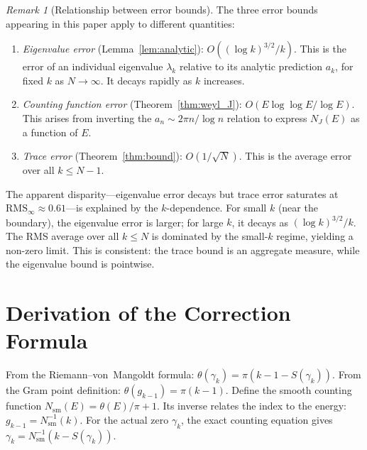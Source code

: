 \documentclass{pre-aomart}
\theoremstyle{plain}
\theoremstyle{definition}
\theoremstyle{remark}
\newtheorem{remark}[theorem]{Remark}
\begin{document}
\begin{remark}[Relationship between error bounds]\label{rem:error_bounds}
The three error bounds appearing in this paper apply to different quantities:
\begin{enumerate}
\item \emph{Eigenvalue error} (Lemma~\ref{lem:analytic}): $O((\log k)^{3/2}/k)$.
  This is the error of an individual eigenvalue $\lambda_k$ relative to its
  analytic prediction $a_k$, for fixed $k$ as $N \to \infty$.
  It decays rapidly as $k$ increases.

\item \emph{Counting function error} (Theorem~\ref{thm:weyl_J}):
  $O(E\log\log E/\log E)$.
  This arises from inverting the $a_n \sim 2\pi n/\log n$ relation to
  express $N_J(E)$ as a function of $E$.

\item \emph{Trace error} (Theorem~\ref{thm:bound}): $O(1/\sqrt{N})$.
  This is the average error over all $k \le N-1$.
\end{enumerate}
The apparent disparity---eigenvalue error decays but trace error saturates at
$\text{RMS}_\infty \approx 0.61$---is explained by the $k$-dependence.
For small $k$ (near the boundary), the eigenvalue error is larger;
for large $k$, it decays as $(\log k)^{3/2}/k$.
The RMS average over all $k \le N$ is dominated by the small-$k$ regime,
yielding a non-zero limit.  This is consistent: the trace bound is an
aggregate measure, while the eigenvalue bound is pointwise.
\end{remark}

\section{Derivation of the Correction Formula}
\label{sec:correction_proof}

From the Riemann--von~Mangoldt formula:
$\theta(\gamma_k) = \pi(k - 1 - S(\gamma_k))$.
From the Gram point definition: $\theta(g_{k-1}) = \pi(k-1)$.
Define the smooth counting function $N_{\text{sm}}(E) = \theta(E)/\pi + 1$. Its inverse relates the index to the energy: $g_{k-1} = N_{\text{sm}}^{-1}(k)$.
For the actual zero $\gamma_k$, the exact counting equation gives $\gamma_k = N_{\text{sm}}^{-1}(k - S(\gamma_k))$.
\end{document}
